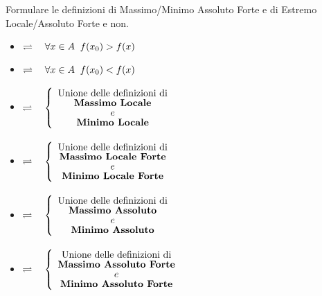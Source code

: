 \begin{exercise}
	Formulare le definizioni di Massimo/Minimo Assoluto Forte e di Estremo Locale/Assoluto Forte e non.
	\begin{solution}\leavevmode
		\begin{itemize}
			\item {}
				$\rightleftharpoons \quad \forall x \in A \;\; f(x_0) > f(x)$
			\item {}
				$\rightleftharpoons \quad \forall x \in A \;\; f(x_0) < f(x)$
			\item {}
				$\rightleftharpoons \quad
				\begin{cases}
					\begin{array}{c}
						\text{Unione delle definizioni di}\\[-1ex]
						\text{\textbf{Massimo Locale}}\\[-1ex]
						e\\[-1ex]
						\text{\textbf{Minimo Locale}}
					\end{array}
				\end{cases}$
			\item {}
				$\rightleftharpoons \quad
				\begin{cases}
					\begin{array}{c}
						\text{Unione delle definizioni di}\\[-1ex]
						\text{\textbf{Massimo Locale Forte}}\\[-1ex]
						e\\[-1ex]
						\text{\textbf{Minimo Locale Forte}}
					\end{array}
				\end{cases}$
			\item {}
				$\rightleftharpoons \quad
				\begin{cases}
					\begin{array}{c}
						\text{Unione delle definizioni di}\\[-1ex]
						\text{\textbf{Massimo Assoluto}}\\[-1ex]
						e\\[-1ex]
						\text{\textbf{Minimo Assoluto}}
					\end{array}
				\end{cases}$
			\item {}
				$\rightleftharpoons \quad
				\begin{cases}
					\begin{array}{c}
						\text{Unione delle definizioni di}\\[-1ex]
						\text{\textbf{Massimo Assoluto Forte}}\\[-1ex]
						e\\[-1ex]
						\text{\textbf{Minimo Assoluto Forte}}
					\end{array}
				\end{cases}$
		\end{itemize}
	\end{solution}
\end{exercise}
